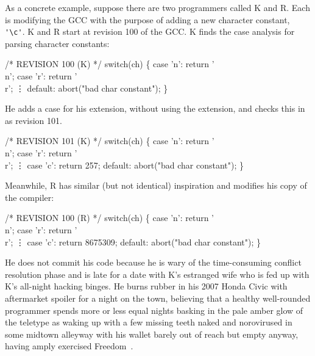\documentclass[twocolumn]{article}
\begin{document}
As a concrete example, suppose there are two programmers called K and
R. Each is modifying the GCC with the purpose of adding a new
character constant, \verb+'\c'+. K and R start at revision 100 of the
GCC. K finds the case analysis for parsing character constants:
%
\begin{code}
/* REVISION 100 (K) */
switch(ch) \{
  case 'n': return '\\n';
  case 'r': return '\\r';
  \vdots
  default: abort("bad char constant");
\}
\end{code}
%
He adds a case for his extension, without using the extension, and
checks this in as revision 101.
%
\begin{code}
/* REVISION 101 (K) */
switch(ch) \{
  case 'n': return '\\n';
  case 'r': return '\\r';
  \vdots
  case 'c': return 257;
  default: abort("bad char constant");
\}
\end{code}
%
Meanwhile, R has similar (but not identical) inspiration and modifies
his copy of the compiler:
%
\begin{code}
/* REVISION 100 (R) */
switch(ch) \{
  case 'n': return '\\n';
  case 'r': return '\\r';
  \vdots
  case 'c': return 8675309;
  default: abort("bad char constant");
\}
\end{code}
%
He does not commit his code because he is wary of the time-consuming
conflict resolution phase and is late for a date with K's estranged
wife who is fed up with K's all-night hacking binges. He burns rubber
in his 2007 Honda Civic with aftermarket spoiler
for a night on the town, believing that a healthy well-rounded
programmer spends more or less equal nights basking in the pale amber
glow of the teletype as waking up with a few missing teeth naked and
norovirused in some midtown alleyway with his wallet barely out of
reach but empty anyway, having amply exercised Freedom~\fbeer.
\end{document}
